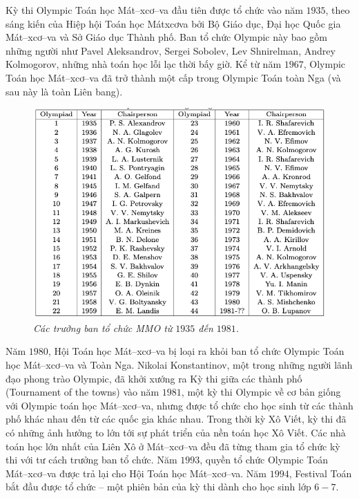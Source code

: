 \begin{multicols}{2}
	Kỳ thi Olympic Toán học Mát--xcơ--va đầu tiên được tổ chức vào năm $1935$, theo sáng kiến của Hiệp hội Toán học Mátxcơva bởi Bộ Giáo dục, Đại học Quốc gia Mát--xcơ--va và Sở Giáo dục Thành phố. Ban tổ chức Olympic này bao gồm những người như Pavel Aleksandrov, Sergei Sobolev, Lev Shnirelman, Andrey Kolmogorov, những nhà toán học lỗi lạc thời bấy giờ. Kể từ năm $1967$, Olympic Toán học Mát--xcơ--va đã trở thành một cấp trong Olympic Toán toàn Nga (và sau này là toàn Liên bang).
	\begin{figure}[H]
		\vspace*{-5pt}
		\centering
		\captionsetup{labelformat= empty, justification=centering}
		\includegraphics[width= 1\linewidth]{1}
		\caption{\small\textit{\color{cackithi}Các trưởng ban tổ chức MMO từ $1935$ đến $1981$.}}
		\vspace*{-10pt}
	\end{figure}
	Năm $1980$, Hội Toán học Mát--xcơ--va bị loại ra khỏi ban tổ chức Olympic Toán học Mát--xcơ--va và Toàn Nga. Nikolai Konstantinov, một trong những người lãnh đạo phong trào Olympic, đã khởi xướng ra Kỳ thi giữa các thành phố (Tournament of the towns) vào năm $1981$, một kỳ thi Olympic về cơ bản giống với Olympic toán học Mát--xcơ--va, nhưng được tổ chức cho học sinh từ các thành phố khác nhau đến từ các quốc gia khác nhau.  
	\vskip 0.1cm
	Trong thời kỳ Xô Viết, kỳ thi đã có những ảnh hưởng to lớn tới sự phát triển của nền toán học Xô Viết. Các nhà toán học lớn nhất của Liên Xô ở Mát--xcơ--va đều đã từng tham gia tổ chức kỳ thi với tư cách trưởng ban tổ chức. 
	\vskip 0.1cm
	Năm $1993$, quyền tổ chức Olympic Toán Mát--xcơ--va được trả lại cho Hội Toán học Mát--xcơ--va. Năm $1994$, Festival Toán bắt đầu được tổ chức -- một phiên bản của kỳ thi dành cho học sinh lớp $6-7$.

\end{multicols}
